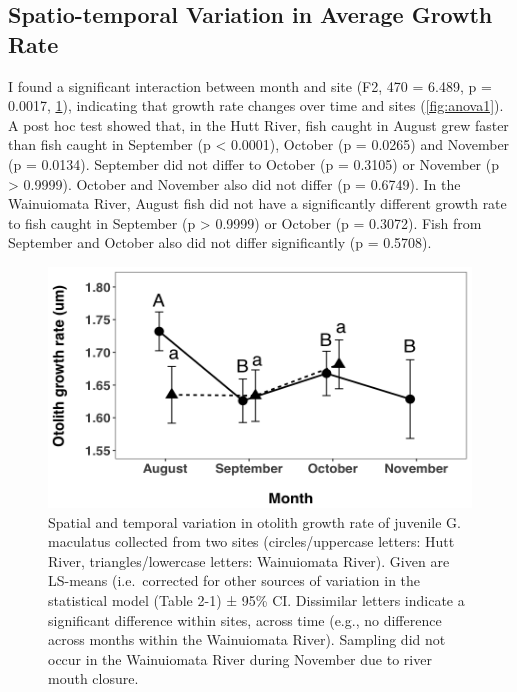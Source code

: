 \documentclass[]{book}
\begin{document}
\subsection{Spatio-temporal Variation in Average Growth
Rate}\label{spatio-temporal-variation-in-average-growth-rate}

I found a significant interaction between month and site (F2, 470 =
6.489, p = 0.0017, \ref{fig:spatiotemporalgrowthrate}), indicating that
growth rate changes over time and sites (\ref{fig:anova1}). A post hoc
test showed that, in the Hutt River, fish caught in August grew faster
than fish caught in September (p \textless{} 0.0001), October (p =
0.0265) and November (p = 0.0134). September did not differ to October
(p = 0.3105) or November (p \textgreater{} 0.9999). October and November
also did not differ (p = 0.6749). In the Wainuiomata River, August fish
did not have a significantly different growth rate to fish caught in
September (p \textgreater{} 0.9999) or October (p = 0.3072). Fish from
September and October also did not differ significantly (p = 0.5708).

\begin{figure}
\centering
\includegraphics{images/spatiotemporalgrowthrate.png}
\caption{\label{fig:spatiotemporalgrowthrate}Spatial and temporal variation
in otolith growth rate of juvenile G. maculatus collected from two sites
(circles/uppercase letters: Hutt River, triangles/lowercase letters:
Wainuiomata River). Given are LS-means (i.e.~corrected for other sources
of variation in the statistical model (Table 2-1) ± 95\% CI. Dissimilar
letters indicate a significant difference within sites, across time
(e.g., no difference across months within the Wainuiomata River).
Sampling did not occur in the Wainuiomata River during November due to
river mouth closure.}
\end{figure}
\end{document}
